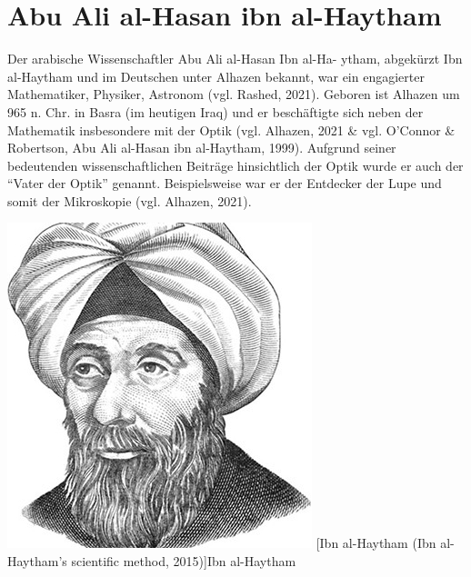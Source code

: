 \section{Abu Ali al-Hasan ibn al-Haytham}

\begin{minipage}{0.65\linewidth}
Der arabische Wissenschaftler Abu Ali al-Hasan Ibn al-Ha-
ytham, abgekürzt Ibn al-Haytham und im Deutschen unter
Alhazen bekannt, war ein engagierter Mathematiker,
Physiker, Astronom (vgl. Rashed, 2021). Geboren ist
Alhazen um 965 n. Chr. in Basra (im heutigen Iraq) und
er beschäftigte sich neben der Mathematik insbesondere 
mit der Optik (vgl. Alhazen, 2021 \& vgl. O'Connor \& 
Robertson, Abu Ali al-Hasan ibn al-Haytham, 1999).
Aufgrund seiner bedeutenden wissenschaftlichen Beiträge
hinsichtlich der Optik wurde er auch der ``Vater der Optik''
genannt. Beispielsweise war er der Entdecker der Lupe 
und somit der Mikroskopie (vgl. Alhazen, 2021).
\end{minipage}
\hfil
\begin{minipage}[r]{0.3\linewidth}
  \captionsetup{type=figure,font=small,skip=6pt,format=plain}%
  \capstart
  \includegraphics[width=1.0\linewidth]{./images/alhazen.jpg}
  [Ibn al-Haytham (Ibn al-Haytham's scientific method, 2015)]{Ibn al-Haytham}
  \label{fig:portrait_alhazen}
\end{minipage}
\vspace{.3cm}

